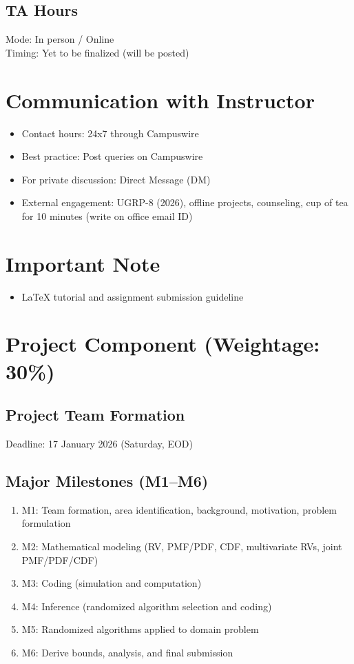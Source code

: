 \documentclass[12pt]{article}
\begin{document}
\subsection*{TA Hours}

Mode: In person / Online\\
Timing: Yet to be finalized (will be posted)

\section*{Communication with Instructor}

\begin{itemize}
\item Contact hours: 24x7 through Campuswire
\item Best practice: Post queries on Campuswire
\item For private discussion: Direct Message (DM)
\item External engagement: UGRP-8 (2026), offline projects, counseling, cup of tea for 10 minutes (write on office email ID)
\end{itemize}

\section*{Important Note}

\begin{itemize}
\item LaTeX tutorial and assignment submission guideline
\end{itemize}

\section*{Project Component (Weightage: 30\%)}

\subsection*{Project Team Formation}

Deadline: 17 January 2026 (Saturday, EOD)

\subsection*{Major Milestones (M1--M6)}

\begin{enumerate}
\item M1: Team formation, area identification, background, motivation, problem formulation
\item M2: Mathematical modeling (RV, PMF/PDF, CDF, multivariate RVs, joint PMF/PDF/CDF)
\item M3: Coding (simulation and computation)
\item M4: Inference (randomized algorithm selection and coding)
\item M5: Randomized algorithms applied to domain problem
\item M6: Derive bounds, analysis, and final submission
\end{enumerate}
\end{document}
